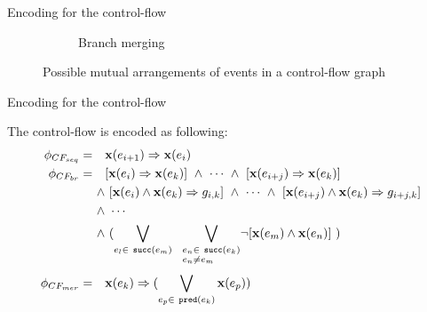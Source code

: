 \documentclass{beamer}
\newcommand*{\fx}{\ensuremath{\mathbf{x}}}%
\newcommand{\defeq}{\ensuremath{=}}%
\begin{document}
\begin{frame}{Encoding for the control-flow}
\begin{figure}[b]
\begin{minipage}{\textwidth}
\begin{subfigure}[b]{0.3\textwidth}
{
        }
        \caption{Branch merging}
    \end{subfigure}
    \caption{Possible mutual arrangements of events in a control-flow graph} %
    \label{encode:cf}
\end{minipage}
\end{figure}

\end{frame}


\begin{frame}{Encoding for the control-flow} %

The control-flow is encoded as following:
\begin{align}
\phi_{CF_{seq}} \defeq \quad & \fx(e_{i+1}) \Rightarrow \fx(e_i) \nonumber\\
\phi_{CF_{br}}  \defeq \quad & [\fx(e_i) \Rightarrow \fx(e_k)] \ \land \ \cdots \ \land \ [\fx(e_{i+j}) \Rightarrow \fx(e_k)] \nonumber \nonumber\\
                       \land & \ [\fx(e_i) \land \fx(e_k) \Rightarrow g_{i,k}] \ \land \ \cdots \ \land \ [\fx(e_{i+j}) \land \fx(e_k) \Rightarrow g_{i+j,k}] \nonumber \\
                       \land & \ \cdots \nonumber \nonumber\\
                       \land & \ ( \bigvee_{e_l \in \ \texttt{succ}(e_m)} \ \ \bigvee_{\begin{subarray}{l}e_n \in \ \texttt{succ}(e_k) \nonumber\\
                               e_n \neq e_m\end{subarray}} \! \lnot [\fx(e_m) \land \fx(e_n)] \ ) \nonumber\\
\phi_{CF_{mer}} \defeq \quad & \fx(e_k) \Rightarrow (\bigvee\limits_{e_p \in \ \texttt{pred}(e_k)}^{} \fx(e_p)) \nonumber
\end{align}

\end{frame}
\end{document}
